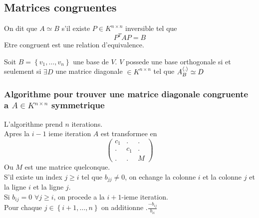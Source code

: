 \documentclass[../main.tex]{subfiles}
\begin{document}
\subsection{Matrices congruentes}
On dit que $A \simeq B$ s'il existe  $P \in K^{n\times n}$ inversible tel que
\[ 
P^{T}A P = B
\]
Etre congruent est une relation d'equivalence.
\begin{lemma}
	Soit $B = \left\{ v_1, \ldots, v_n \right\} $ une base de $V$. $V$ possede une base orthogonale si et seulement si $\exists D$ une matrice diagonale $\in K^{n\times n}$ tel que $A_B^{\left\langle.\right\rangle }\simeq D$
\end{lemma}
\subsubsection*{Algorithme pour trouver une matrice diagonale congruente a $A \in K^{n\times n}$ symmetrique}
L'algorithme prend $n$ iterations.\\
Apres la $i-1$ ieme iteration $A$ est transformee en
\[ 
\begin{pmatrix}
	c_1 & . & .  \\
	. & c_1 &. \\
	. & . & M 
\end{pmatrix}
\]
Ou $M$ est une matrice quelconque.\\
S'il existe un index $j\geq i$ tel que $b_{j j} \neq 0 $, on echange la colonne $i$ et la colonne $j$ et la ligne $i$ et la ligne $j$.\\
Si $b_{ij} =0$ $\forall j \geq i$, on procede a la $i+1$-ieme iteration.\\
Pour chaque $j \in \left\{ i+1, \ldots, n \right\} $ on additionne $.\frac{- b_{ij} }{b_{ii} }$

	
\end{document}
